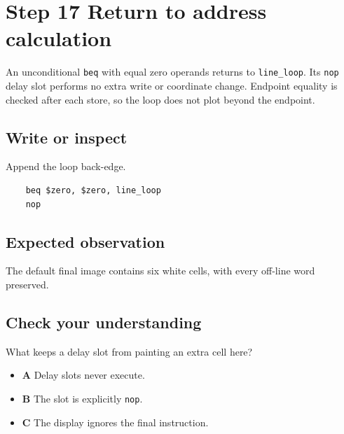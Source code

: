 \section{Step 17 Return to address
  calculation}\label{007-bresenham-line-s17-step-17-return-to-address-calculation}

An unconditional \texttt{beq} with equal zero operands returns to
\texttt{line\_loop}. Its \texttt{nop} delay slot performs no extra write
or coordinate change. Endpoint equality is checked after each store, so
the loop does not plot beyond the endpoint.

\subsection{Write or
  inspect}\label{007-bresenham-line-s17-write-or-inspect}

Append the loop back-edge.

\begin{verbatim}
    beq $zero, $zero, line_loop
    nop
\end{verbatim}

\subsection{Expected
  observation}\label{007-bresenham-line-s17-expected-observation}

The default final image contains six white cells, with every off-line
word preserved.

\subsection{Check your
  understanding}\label{007-bresenham-line-s17-check-your-understanding}

What keeps a delay slot from painting an extra cell here?

\begin{itemize}
  \tightlist
  \item
        \textbf{A} Delay slots never execute.
  \item
        \textbf{B} The slot is explicitly \texttt{nop}.
  \item
        \textbf{C} The display ignores the final instruction.
\end{itemize}
